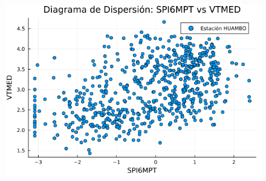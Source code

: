 \begin{figure}[htbp]
\begin{minipage}{0.32\textwidth}
    \includegraphics[width=\linewidth]{Capitulos/Scaterplot/HUAMBO_SPI6MPT_vs_VTMED.png}
\end{minipage}

\vspace{0.5cm}  %


\end{figure}
